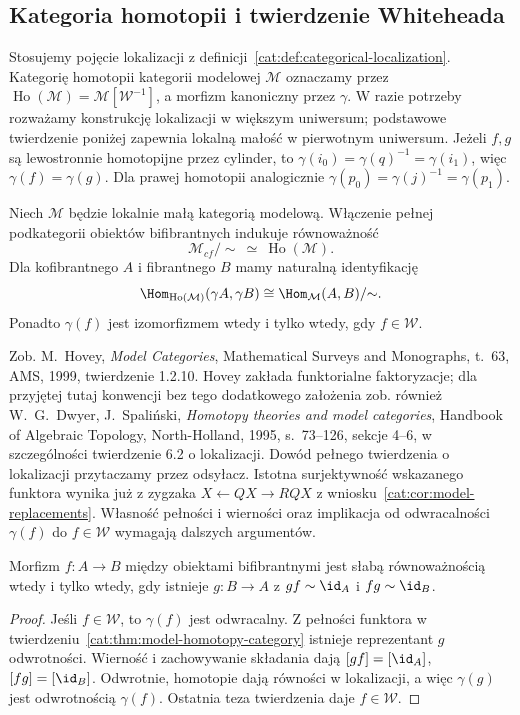 \subsection{Kategoria homotopii i twierdzenie Whiteheada}

Stosujemy pojęcie lokalizacji z definicji~\ref{cat:def:categorical-localization}. Kategorię homotopii kategorii modelowej $\mathcal M$ oznaczamy przez $\operatorname{Ho}(\mathcal M)=\mathcal M[\mathcal W^{-1}]$, a morfizm kanoniczny przez $\gamma$. W razie potrzeby rozważamy konstrukcję lokalizacji w większym uniwersum; podstawowe twierdzenie poniżej zapewnia lokalną małość w pierwotnym uniwersum. Jeżeli $f,g$ są lewostronnie homotopijne przez cylinder, to $\gamma(i_0)=\gamma(q)^{-1}=\gamma(i_1)$, więc $\gamma(f)=\gamma(g)$. Dla prawej homotopii analogicznie $\gamma(p_0)=\gamma(j)^{-1}=\gamma(p_1)$.

\begin{twierdzenie}\label{cat:thm:model-homotopy-category}
Niech $\mathcal M$ będzie lokalnie małą kategorią modelową. Włączenie pełnej podkategorii obiektów bifibrantnych indukuje równoważność
\[
 \mathcal M_{cf}/{\sim}\ \simeq\ \operatorname{Ho}(\mathcal M).
\]
Dla kofibrantnego $A$ i fibrantnego $B$ mamy naturalną identyfikację
\[
 \Hom_{\operatorname{Ho}(\mathcal M)}(\gamma A,\gamma B)
 \cong \Hom_{\mathcal M}(A,B)/{\sim}.
\]
Ponadto $\gamma(f)$ jest izomorfizmem wtedy i tylko wtedy, gdy $f\in\mathcal W$.
\end{twierdzenie}
Zob. M.~Hovey, \emph{Model Categories}, Mathematical Surveys and Monographs, t.~63, AMS, 1999, twierdzenie 1.2.10. Hovey zakłada funktorialne faktoryzacje; dla przyjętej tutaj konwencji bez tego dodatkowego założenia zob. również W.~G.~Dwyer, J.~Spaliński, \emph{Homotopy theories and model categories}, Handbook of Algebraic Topology, North-Holland, 1995, s.~73--126, sekcje 4--6, w szczególności twierdzenie 6.2 o lokalizacji. Dowód pełnego twierdzenia o lokalizacji przytaczamy przez odsyłacz. Istotna surjektywność wskazanego funktora wynika już z zygzaka $X\leftarrow QX\to RQX$ z wniosku~\ref{cat:cor:model-replacements}. Własność pełności i wierności oraz implikacja od odwracalności $\gamma(f)$ do $f\in\mathcal W$ wymagają dalszych argumentów.

\begin{wniosek}\label{cat:cor:model-whitehead}
Morfizm $f:A\to B$ między obiektami bifibrantnymi jest słabą równoważnością wtedy i tylko wtedy, gdy istnieje $g:B\to A$ z $gf\sim\id_A$ i $fg\sim\id_B$.
\end{wniosek}
\begin{proof}
Jeśli $f\in\mathcal W$, to $\gamma(f)$ jest odwracalny. Z pełności funktora w twierdzeniu~\ref{cat:thm:model-homotopy-category} istnieje reprezentant $g$ odwrotności. Wierność i zachowywanie składania dają $[gf]=[\id_A]$, $[fg]=[\id_B]$. Odwrotnie, homotopie dają równości w lokalizacji, a więc $\gamma(g)$ jest odwrotnością $\gamma(f)$. Ostatnia teza twierdzenia daje $f\in\mathcal W$.
\end{proof}

